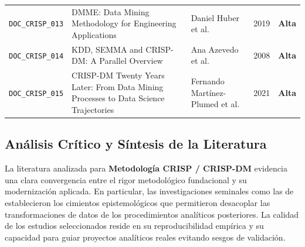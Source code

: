 \begin{table}[H]
\begin{tabular}{p{1.8cm}p{4.5cm}p{3.2cm}cc}
\texttt{DOC_CRISP_013} & DMME: Data Mining Methodology for Engineering Applications & Daniel Huber et al. & 2019 & \textbf{Alta} \\
\texttt{DOC_CRISP_014} & KDD, SEMMA and CRISP-DM: A Parallel Overview & Ana Azevedo et al. & 2008 & \textbf{Alta} \\
\texttt{DOC_CRISP_015} & CRISP-DM Twenty Years Later: From Data Mining Processes to Data Science Trajectories & Fernando Martínez-Plumed et al. & 2021 & \textbf{Alta} \\
\bottomrule
\end{tabular}
\end{table}


\subsection{Análisis Crítico y Síntesis de la Literatura}
La literatura analizada para \textbf{Metodología CRISP / CRISP-DM} evidencia una clara convergencia entre el rigor metodológico fundacional y su modernización aplicada. 
En particular, las investigaciones seminales como las de \citeauthor{pete} establecieron los cimientos epistemológicos que permitieron desacoplar las transformaciones de datos de los procedimientos analíticos posteriores. 
La calidad de los estudios seleccionados reside en su reproducibilidad empírica y su capacidad para guiar proyectos analíticos reales evitando sesgos de validación.


